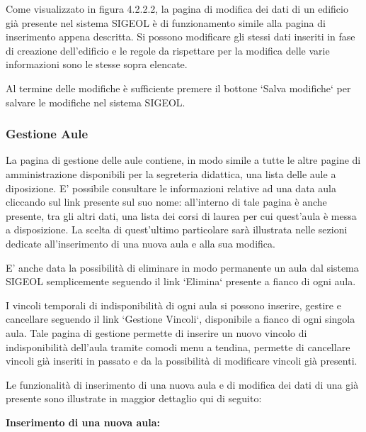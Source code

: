 \documentclass[11pt,a4paper]{article}
\begin{document}
Come visualizzato in figura 4.2.2.2, la pagina di modifica dei dati di un edificio già presente nel sistema SIGEOL è di funzionamento simile alla pagina di inserimento appena descritta. Si possono modificare gli stessi dati inseriti in fase di creazione dell'edificio e le regole da rispettare per la modifica delle varie informazioni sono le stesse sopra elencate.

Al termine delle modifiche è sufficiente premere il bottone `Salva modifiche` per salvare le modifiche nel sistema SIGEOL.
\subsubsection{Gestione Aule}
La pagina di gestione delle aule contiene, in modo simile a tutte le altre pagine di amministrazione disponibili per la segreteria didattica, una lista delle aule a diposizione.
E' possibile consultare le informazioni relative ad una data aula cliccando sul link presente sul suo nome: all'interno di tale pagina è anche presente, tra gli altri dati, una lista dei corsi di laurea per cui quest'aula è messa a disposizione. La scelta di quest'ultimo particolare sarà illustrata nelle sezioni dedicate all'inserimento di una nuova aula e alla sua modifica.

E' anche data la possibilità di eliminare in modo permanente un aula dal sistema SIGEOL semplicemente seguendo il link `Elimina` presente a fianco di ogni aula.

I vincoli temporali di indisponibilità di ogni aula si possono inserire, gestire e cancellare seguendo il link `Gestione Vincoli`, disponibile a fianco di ogni singola aula. Tale pagina di gestione permette di inserire un nuovo vincolo di indisponibilità dell'aula tramite comodi menu a tendina, permette di cancellare vincoli già inseriti in passato e da la possibilità di modificare vincoli già presenti.

Le funzionalità di inserimento di una nuova aula e di modifica dei dati di una già presente sono illustrate in maggior dettaglio qui di seguito:
\newline \newline
\begin{large}\textbf{Inserimento di una nuova aula:}\end{large}
\end{document}
